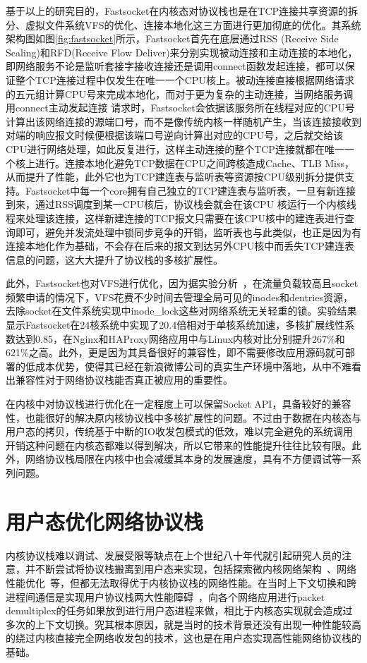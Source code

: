 基于以上的研究目的，Fastsocket在内核态对协议栈也是在TCP连接共享资源的拆分、虚拟文件系统VFS的优化、连接本地化这三方面进行更加彻底的优化。其系统架构图如图\ref{fig:fastsocket}所示，Fastsocket首先在底层通过RSS (Receive Side Scaling)和RFD(Receive Flow Deliver)来分别实现被动连接和主动连接的本地化，即网络服务不论是监听套接字接收连接还是调用connect函数发起连接，都可以保证整个TCP连接过程中仅发生在唯一一个CPU核上。被动连接直接根据网络请求的五元组计算CPU号来完成本地化，而对于更为复杂的主动连接，当网络服务调用connect主动发起连接 请求时，Fastsocket会依据该服务所在线程对应的CPU号计算出该网络连接的源端口号，而不是像传统内核一样随机产生，当该连接接收到对端的响应报文时候便根据该端口号逆向计算出对应的CPU号，之后就交给该CPU进行网络处理，如此反复进行，这样主动连接的整个TCP连接就都在唯一一个核上进行。连接本地化避免TCP数据在CPU之间跨核造成Cache、TLB Miss，从而提升了性能，此外它也为TCP建连表与监听表等资源按CPU级别拆分提供支持。Fastsocket中每一个core拥有自己独立的TCP建连表与监听表，一旦有新连接到来，通过RSS调度到某一CPU核后，协议栈会就会在该CPU 核运行一个内核线程来处理该连接，这样新建连接的TCP报文只需要在该CPU核中的建连表进行查询即可，避免并发流处理中锁同步竞争的开销，监听表也与此类似，也正是因为有连接本地化作为基础，不会存在后来的报文到达另外CPU核中而丢失TCP建连表信息的问题，这大大提升了协议栈的多核扩展性。



此外，Fastsocket也对VFS进行优化，因为据实验分析~\cite{boyd2010analysis}，在流量负载较高且socket频繁申请的情况下，VFS花费不少时间去管理全局可见的inodes和dentries资源，去除socket在文件系统实现中inode\_lock这些对网络系统无关轻重的锁。实验结果显示Fastsocket在24核系统中实现了20.4倍相对于单核系统加速，多核扩展线性系数达到0.85，在Nginx和HAProxy网络应用中与Linux内核对比分别提升267\%和621\%之高。此外，更是因为其具备很好的兼容性，即不需要修改应用源码就可部署的低成本优势，使得其已经在新浪微博公司的真实生产环境中落地，从中不难看出兼容性对于网络协议栈能否真正被应用的重要性。

在内核中对协议栈进行优化在一定程度上可以保留Socket API，具备较好的兼容性，也能很好的解决原内核协议栈中多核扩展性的问题。不过由于数据在内核态与用户态的拷贝，传统基于中断的IO收发包模式的低效，难以完全避免的系统调用开销这种问题在内核态都难以得到解决，所以它带来的性能提升往往比较有限。此外，网络协议栈局限在内核中也会减缓其本身的发展速度，具有不方便调试等一系列问题。

\section{用户态优化网络协议栈}
\label{sec:userspace}
内核协议栈难以调试、发展受限等缺点在上个世纪八十年代就引起研究人员的注意，并不断尝试将协议栈搬离到用户态来实现，包括探索微内核网络架构~\cite{maeda1994protocol}、网络性能优化~\cite{thekkath1993implementing,basu1995user,edwards1995experiences}等，但都无法取得优于内核协议栈的网络性能。在当时上下文切换和跨进程间通信是实现用户协议栈两大性能障碍~\cite{1987packer}，向各个网络应用进行packet demultiplex的任务如果放到进行用户态进程来做，相比于内核态实现就会造成过多次的上下文切换。究其根本原因，就是当时的技术背景还没有出现一种性能较高的绕过内核直接完全网络收发包的技术，这也是在用户态实现高性能网络协议栈的基础。


